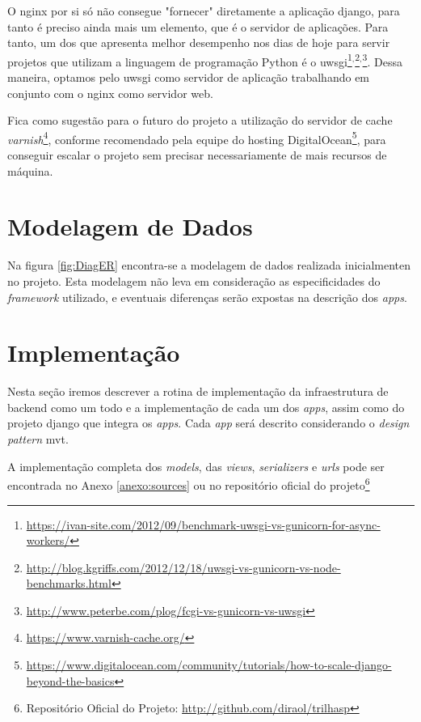 O \gls{nginx} por si só não consegue "fornecer" diretamente a aplicação django, para tanto é preciso ainda mais um elemento, que é o servidor de aplicações. Para tanto, um dos que apresenta melhor desempenho nos dias de hoje para servir projetos que utilizam a linguagem de programação Python é o \gls{uwsgi}\footnote{\url{https://ivan-site.com/2012/09/benchmark-uwsgi-vs-gunicorn-for-async-workers/}}$^,$\footnote{\url{http://blog.kgriffs.com/2012/12/18/uwsgi-vs-gunicorn-vs-node-benchmarks.html}}$^,$\footnote{\url{http://www.peterbe.com/plog/fcgi-vs-gunicorn-vs-uwsgi}}. Dessa maneira, optamos pelo \gls{uwsgi} como servidor de aplicação trabalhando em conjunto com o \gls{nginx} como servidor web.

Fica como sugestão para o futuro do projeto a utilização do servidor de cache \textit{varnish}\footnote{\url{https://www.varnish-cache.org/}}, conforme recomendado pela equipe do hosting DigitalOcean\footnote{\url{https://www.digitalocean.com/community/tutorials/how-to-scale-django-beyond-the-basics}}, para conseguir escalar o projeto sem precisar necessariamente de mais recursos de máquina.

\section{Modelagem de Dados}\label{sec:diagrama-er}
Na figura \ref{fig:DiagER} encontra-se a modelagem de dados realizada inicialmenten no projeto. Esta modelagem não leva em consideração as especificidades do \textit{framework} utilizado, e eventuais diferenças serão expostas na descrição dos \textit{apps}.

\section{Implementação}\label{sec:estrutura-app}
Nesta seção iremos descrever a rotina de implementação da infraestrutura de backend como um todo e a implementação de cada um dos \textit{apps}, assim como do projeto \gls{django} que integra os \textit{apps}. Cada \textit{app} será descrito considerando o \textit{design pattern} \gls{mvt}.

A implementação completa dos \textit{models}, das \textit{views}, \textit{serializers} e \textit{urls} pode ser encontrada no Anexo \ref{anexo:sources} ou no repositório oficial do projeto\footnote{Repositório Oficial do Projeto: \url{http://github.com/diraol/trilhasp}}

